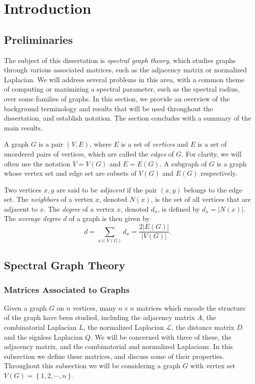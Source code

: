 \chapter{Introduction}

\section{Preliminaries}

The subject of this dissertation is \textit{spectral graph theory}, which studies graphs through
various associated matrices, such as the adjacency matrix or normalized Laplacian.
We will address several problems in this area, with a common theme
of computing or maximizing a spectral parameter, such as the spectral radius, over some families of graphs.  
In this section, we provide an overview of the background terminology and results that will be used throughout the
dissertation, and establish notation.  The section concludes with a summary of the main results.


A graph $G$ is a pair $(V,E)$, where $E$ is a set of \textit{vertices} and $E$ is a set of unordered
pairs of vertices, which are called the \textit{edges} of $G$.  For clarity, we will often
use the notation $V = V(G)$ and $E = E(G)$.  A subgraph of $G$ is a graph whose vertex set and
edge set are subsets of $V(G)$ and $E(G)$ respectively.


Two vertices $x,y$ are said to be \textit{adjacent}
if the pair $(x,y)$ belongs to the edge set.  The \textit{neighbors} of a vertex $x$, denoted $N(x)$,
is the set of all vertices that are adjacent to $x$.  The \textit{degree} of a vertex $x$, denoted $d_x$,
is defined by $d_x = |N(x)|$.  The \textit{average degree} $d$ of a graph is then given by
\[ d = \sum_{x \in V(G)} d_x = \frac{2 |E(G)|}{|V(G)|}. \]



\section{Spectral Graph Theory}

\subsection{Matrices Associated to Graphs}


Given a graph $G$ on $n$ vertices, many $n \times n$ matrices which encode the structure
of the graph have been studied, including the adjacency matrix $A$, the combinatorial Laplacian $L$,
the normalized Laplacian $\mathcal{L}$, the distance matrix $D$ and the signless Laplacian $Q$.
We will be concerned with three of these, the adjacency matrix, and the combinatorial and normalized
Laplacians.  In this subsection we define these matrices, and discuss some of their properties.
Throughout this subsection we will be considering a graph $G$ with vertex set
$V(G) = \left\{ 1,2, \cdots, n\right\}$.


